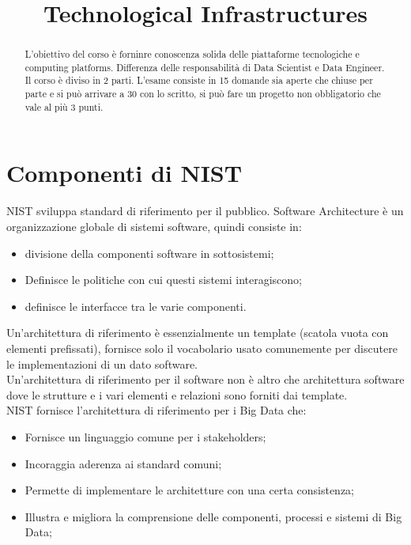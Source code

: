 \documentclass[11pt, twocolumn]{article}
\title{Technological Infrastructures}
\author{}
\date{}
\newenvironment{myitemize}
{ \begin{itemize}
		\setlength{\itemsep}{0pt}
		\setlength{\parskip}{0pt}
		\setlength{\parsep}{0pt}     }
	{ \end{itemize}                  }
\begin{document}
\maketitle

\begin{abstract}
L'obiettivo del corso è forninre conoscenza solida delle piattaforme tecnologiche e computing platforms.
Differenza delle responsabilità di Data Scientist e Data Engineer.
Il corso è diviso in 2 parti.
L'esame consiste in 15 domande sia aperte che chiuse per parte e si può arrivare a 30 con lo scritto, si può fare un progetto non obbligatorio che vale al più 3 punti.
\end{abstract}



\section{Componenti di NIST}
NIST sviluppa standard di riferimento per il pubblico. Software Architecture è un organizzazione globale di sistemi software, quindi consiste in:
\begin{myitemize}
	\item divisione della componenti software in sottosistemi; 
	\item Definisce le politiche con cui questi sistemi interagiscono;
	\item definisce le interfacce tra le varie componenti.
\end{myitemize}
Un'architettura di riferimento è essenzialmente un template (scatola vuota con elementi prefissati), fornisce solo il vocabolario usato comunemente per discutere le implementazioni di un dato software.\\
Un'architettura di riferimento per il software non è altro che architettura software dove le strutture e i vari elementi e relazioni sono forniti dai template.
\\
NIST fornisce l'architettura di riferimento per i Big Data che:
\begin{myitemize}
	\item Fornisce un linguaggio comune per i stakeholders;
	\item Incoraggia aderenza ai standard comuni;
	\item Permette di implementare le architetture con una certa consistenza;
	\item Illustra e migliora la comprensione delle componenti, processi e  sistemi di Big Data;
\end{myitemize}
\end{document}
